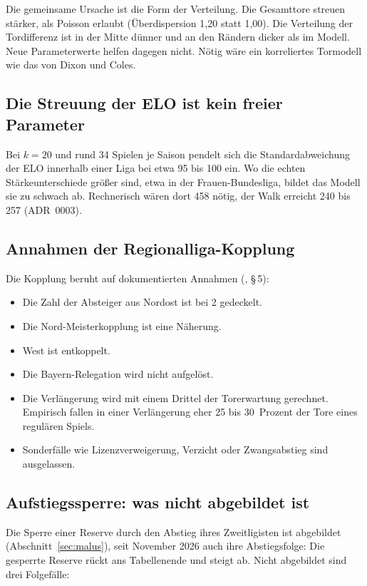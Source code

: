 Die gemeinsame Ursache ist die Form der Verteilung. Die Gesamttore streuen
stärker, als Poisson erlaubt (Überdispersion 1{,}20 statt 1{,}00). Die
Verteilung der Tordifferenz ist in der Mitte dünner und an den Rändern
dicker als im Modell. Neue Parameterwerte helfen dagegen nicht. Nötig wäre
ein korreliertes Tormodell wie das von Dixon und Coles.


\subsection{Die Streuung der ELO ist kein freier Parameter}

Bei $k = 20$ und rund 34 Spielen je Saison pendelt sich die
Standardabweichung der ELO innerhalb einer Liga bei etwa 95 bis 100 ein. Wo
die echten Stärkeunterschiede größer sind, etwa in der Frauen-Bundesliga,
bildet das Modell sie zu schwach ab. Rechnerisch wären dort 458 nötig, der
Walk erreicht 240 bis 257 (ADR~0003).

\subsection{Annahmen der Regionalliga-Kopplung}

Die Kopplung beruht auf dokumentierten Annahmen
(, §\,5):

\begin{itemize}
  \item Die Zahl der Absteiger aus Nordost ist bei 2 gedeckelt.
  \item Die Nord-Meisterkopplung ist eine Näherung.
  \item West ist entkoppelt.
  \item Die Bayern-Relegation wird nicht aufgelöst.
  \item Die Verlängerung wird mit einem Drittel der Torerwartung gerechnet.
        Empirisch fallen in einer Verlängerung eher 25 bis 30~Prozent der
        Tore eines regulären Spiels.
  \item Sonderfälle wie Lizenzverweigerung, Verzicht oder Zwangsabstieg
        sind ausgelassen.
\end{itemize}

\subsection{Aufstiegssperre: was nicht abgebildet ist}

Die Sperre einer Reserve durch den Abstieg ihres Zweitligisten ist abgebildet
(Abschnitt~\ref{sec:malus}), seit November 2026 auch ihre Abstiegsfolge: Die
gesperrte Reserve rückt ans Tabellenende und steigt ab. Nicht abgebildet sind
drei Folgefälle:

